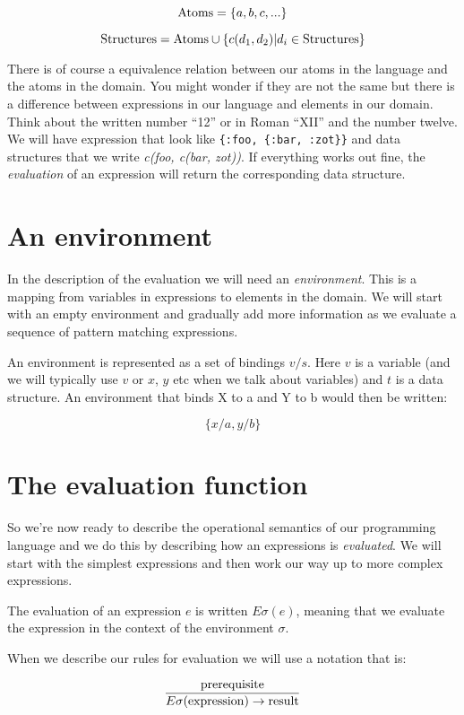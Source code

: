 \documentclass[a4paper,11pt]{article}
\begin{document}
$${\rm Atoms} =  \{a,b,c, ...\}$$

$${\rm Structures} = {\rm Atoms} \cup \{c(d_1, d_2) | d_i \in {\rm Structures}\}$$

There is of course a equivalence relation between our atoms in the
language and the atoms in the domain. You might wonder if they are not
the same but there is a difference between expressions in our language
and elements in our domain. Think about the written number ``12'' or
in Roman ``XII'' and the number twelve. We will have expression that
look like {\tt \{:foo, \{:bar, :zot\}\}} and data structures that we
write {\em c(foo, c(bar, zot))}. If everything works out fine, the
{\em evaluation} of an expression will return the corresponding data
structure.

\section{An environment}

In the description of the evaluation we will need an {\em
  environment}. This is a mapping from variables in expressions to
elements in the domain. We will start with an empty environment and
gradually add more information as we evaluate a sequence of pattern
matching expressions. 

An environment is represented as a set of bindings $v/s$. Here $v$ is
a variable (and we will typically use $v$ or $x$, $y$ etc when we talk
about variables) and $t$ is a data structure. An environment that
binds X to a and Y to b would then be written:

$$\{x/a, y/b\}$$


\section{The evaluation function}

So we're now ready to describe the operational semantics of our
programming language and we do this by describing how an expressions is
{\em evaluated}. We will start with the simplest expressions and then
work our way up to more complex expressions.

The evaluation of an expression $e$ is written $E\sigma(e)$, meaning
that we evaluate the expression in the context of the environment $\sigma$.

When we describe our rules for evaluation we will use
 a notation that is:

$$\frac{{\rm prerequisite}}{E\sigma({\rm expression}) \rightarrow {\rm result}}$$
\end{document}
